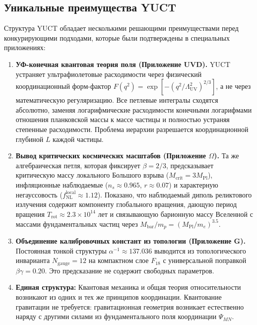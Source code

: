 \documentclass[12pt,a4paper]{article}
\theoremstyle{remark}
\begin{document}
	\subsection{Уникальные преимущества YUCT}
	
	Структура YUCT обладает несколькими решающими преимуществами перед конкурирующими подходами, которые были подтверждены в специальных приложениях:
	
	\begin{enumerate}
		\item \textbf{УФ-конечная квантовая теория поля (Приложение UVD).}
		YUCT устраняет ультрафиолетовые расходимости через физический координационный форм-фактор $F(q^2)=\exp[-(q^2/\Lambda_{\mathrm{UV}}^2)^{2/3}]$, а не через математическую регуляризацию. Все петлевые интегралы сходятся абсолютно, заменяя логарифмические расходимости конечными логарифмами отношения планковской массы к массе частицы и полностью устраняя степенные расходимости. Проблема иерархии разрешается координационной глубиной $L$ каждой частицы.
		
		\item \textbf{Вывод критических космических масштабов (Приложение $\Omega$).}
		Та же алгебраическая петля, которая фиксирует $\beta=2/3$, предсказывает критическую массу локального Большого взрыва ($M_{\mathrm{crit}}=3M_{\mathrm{Pl}}$), инфляционные наблюдаемые ($n_s\approx0.965$, $r\approx0.07$) и характерную негауссовость ($f_{\mathrm{NL}}^{\mathrm{local}}\approx1.12$). Показано, что наблюдаемый диполь реликтового излучения содержит компоненту глобального вращения, дающую период вращения $T_{\mathrm{rot}}\approx2.3\times10^{14}$ лет и связывающую барионную массу Вселенной с массами фундаментальных частиц через $M_{\mathrm{bar}}/m_p=(M_{\mathrm{Pl}}/m_e)^{3.5}$.
		
		\item \textbf{Объединение калибровочных констант из топологии (Приложение G).}
		Постоянная тонкой структуры $\alpha^{-1}\approx137.036$ выводится из топологического инварианта $N_{\mathrm{gauge}}=12$ на компактном слое $F_{18}$ с универсальной поправкой $\beta\gamma=0.20$. Это предсказание не содержит свободных параметров.
		
		\item \textbf{Единая структура:} Квантовая механика и общая теория относительности возникают из одних и тех же принципов координации. Квантование гравитации не требуется: гравитационная геометрия возникает естественно наряду с другими силами из фундаментального поля координации $\Psi_{MN}$.
		

\end{enumerate}
\end{document}
